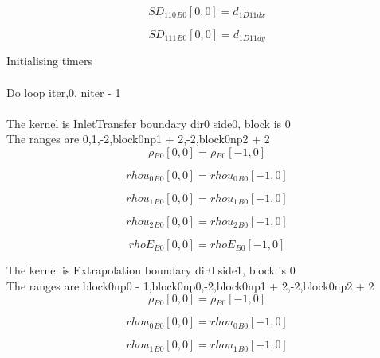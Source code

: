 \documentclass{article}
\begin{document}
\begin{dmath}{SD_{110}{_{B0}}}[{0,0}] = d_{1 D11 dx}\end{dmath}

\begin{dmath}{SD_{111}{_{B0}}}[{0,0}] = d_{1 D11 dy}\end{dmath}

\noindent Initialising timers\\
\\\noindent Do loop iter,0, niter - 1\\
\\\noindent The kernel is InletTransfer boundary dir0 side0, block is 0\\\noindent The ranges are 0,1,-2,block0np1 + 2,-2,block0np2 + 2\\\begin{dmath}{\rho{_{B0}}}[{0,0}] = {\rho{_{B0}}}[{-1,0}]\end{dmath}

\begin{dmath}{rhou_{0}{_{B0}}}[{0,0}] = {rhou_{0}{_{B0}}}[{-1,0}]\end{dmath}

\begin{dmath}{rhou_{1}{_{B0}}}[{0,0}] = {rhou_{1}{_{B0}}}[{-1,0}]\end{dmath}

\begin{dmath}{rhou_{2}{_{B0}}}[{0,0}] = {rhou_{2}{_{B0}}}[{-1,0}]\end{dmath}

\begin{dmath}{rhoE{_{B0}}}[{0,0}] = {rhoE{_{B0}}}[{-1,0}]\end{dmath}

\noindent The kernel is Extrapolation boundary dir0 side1, block is 0\\\noindent The ranges are block0np0 - 1,block0np0,-2,block0np1 + 2,-2,block0np2 + 2\\\begin{dmath}{\rho{_{B0}}}[{0,0}] = {\rho{_{B0}}}[{-1,0}]\end{dmath}

\begin{dmath}{rhou_{0}{_{B0}}}[{0,0}] = {rhou_{0}{_{B0}}}[{-1,0}]\end{dmath}

\begin{dmath}{rhou_{1}{_{B0}}}[{0,0}] = {rhou_{1}{_{B0}}}[{-1,0}]\end{dmath}
\end{document}
